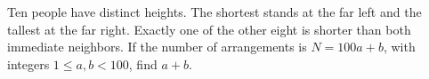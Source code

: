 Ten people have distinct heights. The shortest stands at the far left and the tallest at the far right. Exactly one of the other eight is shorter than both immediate neighbors. If the number of arrangements is $N=100a+b$, with integers $1\le a,b<100$, find $a+b$.
